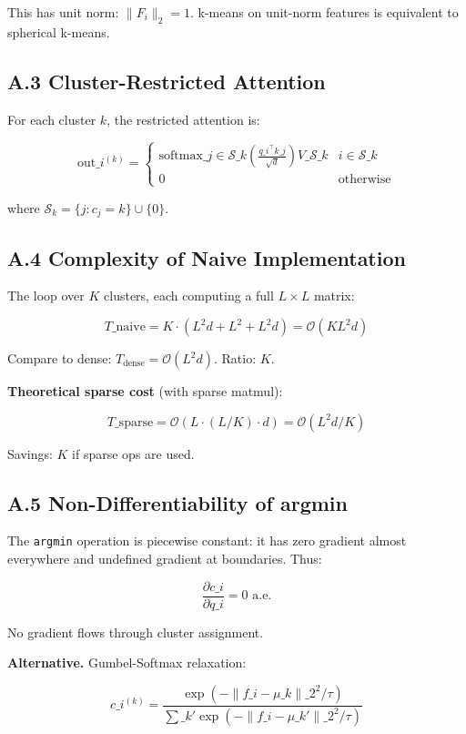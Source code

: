 This has unit norm: $\|F_i\|_2 = 1$. k-means on unit-norm features is 
equivalent to spherical k-means.

\subsection{A.3 Cluster-Restricted Attention}

For each cluster $k$, the restricted attention is:

\[
\text{out}\_i^{(k)} = \begin{cases} 
\text{softmax}\_{j \in \mathcal{S}\_k}\!\left(\frac{q\_i^\top k\_j}{\sqrt{d}}\right) V\_{\mathcal{S}\_k} & i \in \mathcal{S}\_k \\
0 & \text{otherwise}
\end{cases}
\tag{A.3}
\]

where $\mathcal{S}_k = \{j : c_j = k\} \cup \{0\}$.

\subsection{A.4 Complexity of Naive Implementation}

The loop over $K$ clusters, each computing a full $L \times L$ matrix:

\[
T\_\text{naive} = K \cdot \left( L^2 d + L^2 + L^2 d \right) = \mathcal{O}(K L^2 d)
\tag{A.4}
\]

Compare to dense: $T_\text{dense} = \mathcal{O}(L^2 d)$. Ratio: $K$.

\textbf{Theoretical sparse cost} (with sparse matmul):

\[
T\_\text{sparse} = \mathcal{O}(L \cdot (L/K) \cdot d) = \mathcal{O}(L^2 d / K)
\tag{A.5}
\]

Savings: $K$ if sparse ops are used.

\subsection{A.5 Non-Differentiability of argmin}

The \texttt{argmin} operation is piecewise constant: it has zero gradient almost 
everywhere and undefined gradient at boundaries. Thus:

\[
\frac{\partial c\_i}{\partial q\_i} = 0 \text{ a.e.}
\tag{A.6}
\]

No gradient flows through cluster assignment.

\textbf{Alternative.} Gumbel-Softmax relaxation:

\[
c\_i^{(k)} = \frac{\exp(-\|f\_i - \mu\_k\|\_2^2 / \tau)}{\sum\_{k'} \exp(-\|f\_i - \mu\_{k'}\|\_2^2 / \tau)}
\tag{A.7}
\]

